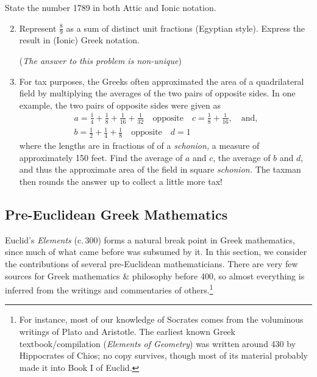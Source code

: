 \begin{exercises}{}{}
	\exstart State the number 1789 in both Attic and Ionic notation.
	\begin{enumerate}\setcounter{enumi}{1}
	  \item%
	  Represent $\frac 89$ as a sum of distinct unit fractions (Egyptian style). Express the result in (Ionic) Greek notation.\par
	  (\emph{The answer to this problem is non-unique})
	  
	  \item%
	  For tax purposes, the Greeks often approximated the area of a quadrilateral field by multiplying the averages of the two pairs of opposite sides. In one example, the two pairs of opposite sides were given as
	  \begin{gather*}
	  a=\frac 14+\frac 18+\frac 1{16}+\frac 1{32}\quad\text{opposite}\quad c=\frac 18+\frac 1{16},\quad\text{and,}\\
	  b=\frac 12+\frac 14+\frac 18\quad\text{opposite}\quad d=1
	  \end{gather*}
	  where the lengths are in fractions of of a \emph{schonion,} a measure of approximately 150 feet. Find the average of $a$ and $c$, the average of $b$ and $d$, and thus the approximate area of the field in square \emph{schonion.} The taxman then rounds the answer up to collect a little more tax!
	\end{enumerate}
\end{exercises}

\clearpage


\subsection{Pre-Euclidean Greek Mathematics}

Euclid's \emph{Elements} (c.\,300\BC) forms a natural break point in Greek mathematics, since much of what came before was subsumed by it. In this section, we consider the contributions of several pre-Euclidean mathematicians. There are very few sources for Greek mathematics \& philosophy before 400\BC{}, so almost everything is inferred from the writings and commentaries of others.\footnote{For instance, most of our knowledge of Socrates comes from the voluminous writings of Plato and Aristotle. The earliest known Greek textbook/compilation (\emph{Elements of Geometry}) was written around 430\BC{} by Hippocrates of Chios; no copy survives, though most of its material probably made it into Book I of Euclid.}\vspace{-5pt}


